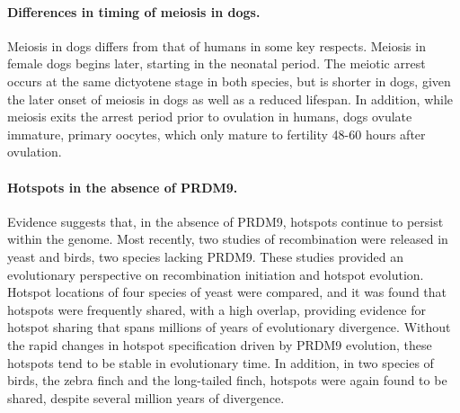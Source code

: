 \paragraph{Differences in timing of meiosis in dogs.}
Meiosis in dogs differs from that of humans in some key respects.
Meiosis in female dogs begins later, starting in the neonatal period\cite{Freixa1987}.
The meiotic arrest occurs at the same dictyotene stage in both species, but is shorter in dogs, given the later onset of meiosis in dogs as well as a reduced lifespan.
In addition, while meiosis exits the arrest period prior to ovulation in humans, dogs ovulate immature, primary oocytes, which only mature to fertility 48-60 hours after ovulation\cite{Tsutsui1989,Chastant-Maillard2011}.


\paragraph{Hotspots in the absence of PRDM9.}
Evidence suggests that, in the absence of PRDM9, hotspots continue to persist within the genome.
Most recently, two studies of recombination were released in yeast\cite{Lam2015} and birds\cite{Singhal2015}, two species lacking PRDM9.
These studies provided an evolutionary perspective on recombination initiation and hotspot evolution.
Hotspot locations of four species of yeast were compared, and it was found that hotspots were frequently shared, with a high overlap, providing evidence for hotspot sharing that spans millions of years of evolutionary divergence\cite{Lam2015}.
Without the rapid changes in hotspot specification driven by PRDM9 evolution, these hotspots tend to be stable in evolutionary time.
In addition, in two species of birds, the zebra finch and the long-tailed finch, hotspots were again found to be shared, despite several million years of divergence\cite{Singhal2015}.


